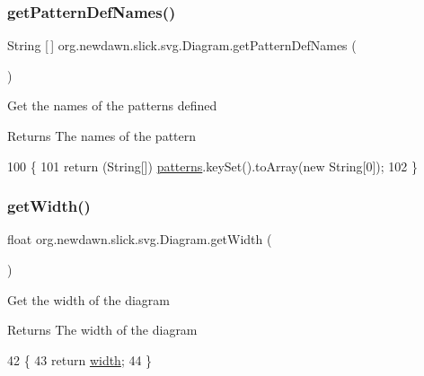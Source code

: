 \subsubsection{\texorpdfstring{get\+Pattern\+Def\+Names()}{getPatternDefNames()}}
{\footnotesize\ttfamily String \mbox{[}$\,$\mbox{]} org.\+newdawn.\+slick.\+svg.\+Diagram.\+get\+Pattern\+Def\+Names (\begin{DoxyParamCaption}{ }\end{DoxyParamCaption})\hspace{0.3cm}{\ttfamily [inline]}}

Get the names of the patterns defined

\begin{DoxyReturn}{Returns}
The names of the pattern 
\end{DoxyReturn}

\begin{DoxyCode}
100                                          \{
101         \textcolor{keywordflow}{return} (String[]) \mbox{\hyperlink{classorg_1_1newdawn_1_1slick_1_1svg_1_1_diagram_ae97126aa813213972c4c755710ab13e6}{patterns}}.keySet().toArray(\textcolor{keyword}{new} String[0]);     
102     \}
\end{DoxyCode}
\mbox{\label{classorg_1_1newdawn_1_1slick_1_1svg_1_1_diagram_ac7ae4b74889a46b9f8cec1aa73de4b44}} 
\subsubsection{\texorpdfstring{get\+Width()}{getWidth()}}
{\footnotesize\ttfamily float org.\+newdawn.\+slick.\+svg.\+Diagram.\+get\+Width (\begin{DoxyParamCaption}{ }\end{DoxyParamCaption})\hspace{0.3cm}{\ttfamily [inline]}}

Get the width of the diagram

\begin{DoxyReturn}{Returns}
The width of the diagram 
\end{DoxyReturn}

\begin{DoxyCode}
42                             \{
43         \textcolor{keywordflow}{return} \mbox{\hyperlink{classorg_1_1newdawn_1_1slick_1_1svg_1_1_diagram_aa2e5e9291614fb66fef4f8d0672a9da6}{width}};
44     \}
\end{DoxyCode}
\mbox{\label{classorg_1_1newdawn_1_1slick_1_1svg_1_1_diagram_a2252efc0fab27de7c268b0efb114c073}} 
